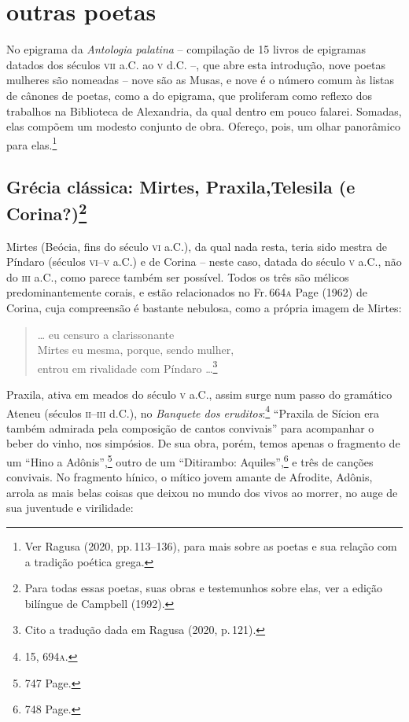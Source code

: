 \section*{outras poetas}

No epigrama da \textit{Antologia palatina} -- compilação de 15 livros de
epigramas datados dos séculos \textsc{vii} a.C. ao \textsc{v} d.C. --, que abre esta introdução,
nove poetas mulheres são nomeadas -- nove são as Musas, e nove é o número comum
às listas de cânones de poetas, como a do epigrama, que proliferam como reflexo
dos trabalhos na Biblioteca de Alexandria, da qual dentro em pouco falarei.
Somadas, elas compõem um modesto conjunto de obra.
Ofereço, pois, um olhar panorâmico para elas.\footnote{Ver Ragusa (2020, pp.\,113--136), para mais sobre as poetas e sua relação com a tradição poética grega.}

\subsection*{Grécia clássica: Mirtes, Praxila,\break Telesila (e
Corina?)\protect\footnote{\MakeUppercase{P}ara todas essas poetas, suas obras e testemunhos sobre elas, ver a edição bilíngue de \MakeUppercase{C}ampbell (1992).}}

Mirtes (Beócia, fins do século \textsc{vi} a.C.), da qual nada resta, teria sido mestra
de Píndaro (séculos \textsc{vi}--\textsc{v} a.C.) e de Corina -- neste caso, datada do século \textsc{v}
a.C., não do \textsc{iii} a.C., como parece também ser possível. Todos os três são
mélicos predominantemente corais, e estão relacionados no Fr.\,664\textsc{a}
Page (1962) de Corina, cuja compreensão
é bastante nebulosa, como a própria imagem de Mirtes:


\begin{verse}
\small{\ldots{} eu censuro a clarissonante\\
Mirtes eu mesma, porque, sendo mulher,\\
entrou em rivalidade com Píndaro \ldots{}}\footnote{Cito a tradução dada em Ragusa (2020, p.\,121).}
\end{verse}

Praxila, ativa em meados do século \textsc{v} a.C., assim surge num passo do gramático
Ateneu (séculos \textsc{ii}--\textsc{iii} d.C.), no \textit{Banquete dos eruditos}:\footnote{15, 694\textsc{a}.}
``Praxila de Sícion era também admirada pela composição de cantos
convivais” para acompanhar o beber do vinho, nos simpósios. De sua obra,
porém, temos apenas o fragmento de um “Hino a Adônis”,\footnote{747 Page.} outro
de um “Ditirambo: Aquiles”,\footnote{748 Page.} e três de canções convivais. No fragmento
hínico, o mítico jovem amante de Afrodite, Adônis, arrola as mais belas coisas
que deixou no mundo dos vivos ao morrer, no auge de sua juventude e virilidade:

